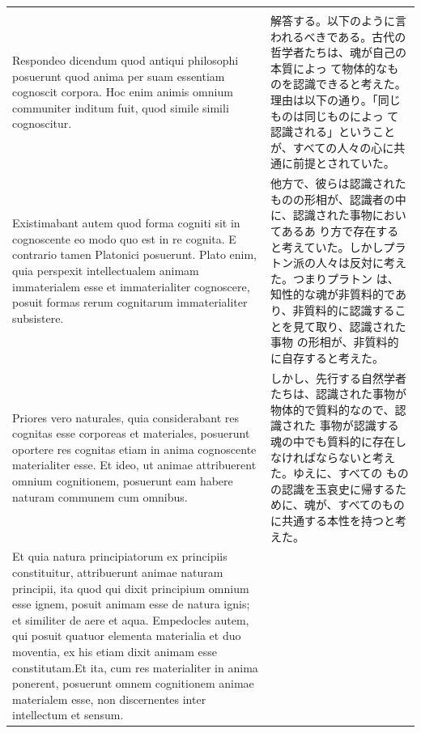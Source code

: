 \documentclass[paper=a4paper,fontsize=10pt,jafontsize=9pt,titlepage]{jlreq}
\begin{document}
\begin{longtable}{p{21em}p{21em}}
&



\\[1em]


Respondeo dicendum quod antiqui philosophi posuerunt quod anima per suam
essentiam cognoscit corpora. Hoc enim animis omnium communiter inditum fuit,
quod simile simili cognoscitur.

&

解答する。以下のように言われるべきである。古代の哲学者たちは、魂が自己の本質によっ
て物体的なものを認識できると考えた。理由は以下の通り。「同じものは同じものによっ
て認識される」ということが、すべての人々の心に共通に前提とされていた。


\\[1em]

Existimabant autem quod forma cogniti sit in cognoscente eo modo quo est in re
cognita. E contrario tamen Platonici posuerunt. Plato enim, quia perspexit
intellectualem animam immaterialem esse et immaterialiter cognoscere, posuit
formas rerum cognitarum immaterialiter subsistere.

&

他方で、彼らは認識されたものの形相が、認識者の中に、認識された事物においてあるあ
り方で存在すると考えていた。しかしプラトン派の人々は反対に考えた。つまりプラトン
は、知性的な魂が非質料的であり、非質料的に認識することを見て取り、認識された事物
の形相が、非質料的に自存すると考えた。

\\[1em]

Priores vero naturales, quia considerabant res cognitas esse corporeas et
materiales, posuerunt oportere res cognitas etiam in anima cognoscente
materialiter esse. Et ideo, ut animae attribuerent omnium cognitionem, posuerunt
eam habere naturam communem cum omnibus.

&

しかし、先行する自然学者たちは、認識された事物が物体的で質料的なので、認識された
事物が認識する魂の中でも質料的に存在しなければならないと考えた。ゆえに、すべての
ものの認識を玉哀史に帰するために、魂が、すべてのものに共通する本性を持つと考えた。


\\[1em]

Et quia natura principiatorum ex principiis constituitur, attribuerunt animae
naturam principii, ita quod qui dixit principium omnium esse ignem, posuit
animam esse de natura ignis; et similiter de aere et aqua. Empedocles autem, qui
posuit quatuor elementa materialia et duo moventia, ex his etiam dixit animam
esse constitutam.Et ita, cum res materialiter in anima ponerent, posuerunt omnem
cognitionem animae materialem esse, non discernentes inter intellectum et
sensum.


\end{longtable}
\end{document}

